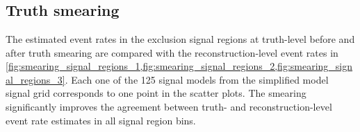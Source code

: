 
\chapter{}


\ifpdf
\graphicspath{{chapter-pmssm/Figs/Raster/}{chapter-pmssm/Figs/PDF/}{chapter-pmssm/Figs/}}
\else
\graphicspath{{chapter-pmssm/Figs/Vector/}{chapter-pmssm/Figs/}}
\fi

\section{Truth smearing}

The estimated event rates in the exclusion signal regions at truth-level before and after truth smearing are compared with the reconstruction-level event rates in \cref{fig:smearing_signal_regions_1,fig:smearing_signal_regions_2,fig:smearing_signal_regions_3}. Each one of the 125 signal models from the simplified model signal grid corresponds to one point in the scatter plots. The smearing significantly improves the agreement between truth- and reconstruction-level event rate estimates in all signal region bins.

